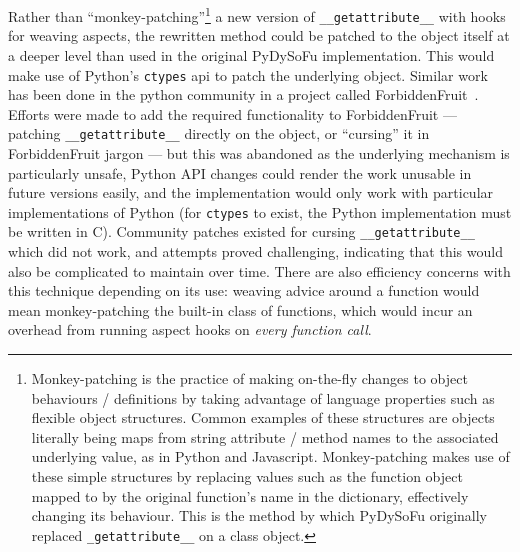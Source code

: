 Rather than ``monkey-patching''\footnote{Monkey-patching is the practice of making on-the-fly changes to object
behaviours / definitions by taking advantage of language properties such as
flexible object structures. Common examples of these structures are objects literally being maps from string
attribute / method names to the associated underlying value, as in Python and Javascript. Monkey-patching
makes use of these simple structures by replacing
values such as the function object mapped to by the original function's name in
the dictionary, effectively changing its behaviour. This is the method by which PyDySoFu originally replaced
\lstinline{_getattribute__} on a class object.} a new version of
\lstinline{__getattribute__} with hooks for weaving aspects, the rewritten
method could be patched to the object itself at a deeper level than used in the
original PyDySoFu implementation. This would make use of Python's
\lstinline{ctypes} api to patch the underlying object. Similar work has been
done in the python community in a project called
ForbiddenFruit~\cite{forbiddenfruit_repo}. Efforts were made to add the required
functionality to ForbiddenFruit --- patching \lstinline{__getattribute__}
directly on the object, or ``cursing'' it in ForbiddenFruit jargon --- but this
was abandoned as the underlying mechanism is particularly unsafe, Python API
changes could render the work unusable in future versions easily, and the
implementation would only work with particular implementations of Python (for
\lstinline{ctypes} to exist, the Python implementation must be written in C).
Community patches existed for cursing \lstinline{__getattribute__} which did not
work, and attempts proved challenging, indicating that this would also be
complicated to maintain over time. There are also efficiency concerns with this
technique depending on its use: weaving advice around a function would mean
monkey-patching the built-in class of functions, which would incur an overhead
from running aspect hooks on \emph{every function call}.

